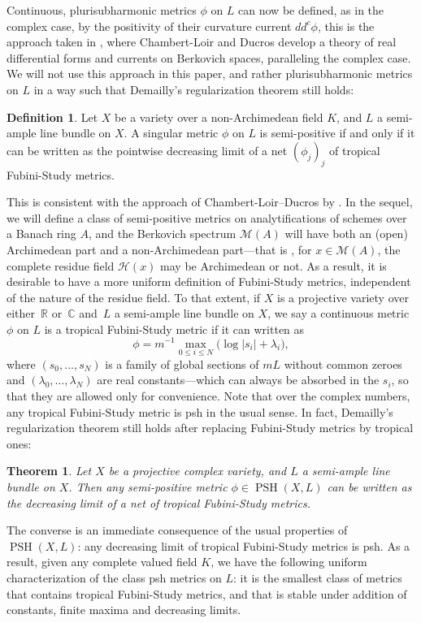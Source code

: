 \documentclass[JEP,XML,SOM,Unicode,published]{cedram}
\newtheorem{theo}[equation]{Theorem}
\theoremstyle{definition}
\newtheorem{defn}[equation]{Definition}
\newcommand \C{\mathbb C}
\newcommand \R{\mathbb R}
\newcommand \M {\mathscr {M}}
\DeclareMathOperator{\PSH}{PSH}
\begin{document}
Continuous, plurisubharmonic metrics $\phi$ on $L$ can now be defined, as in the complex case, by the positivity of their curvature current $dd^c \phi$, this is the approach taken in \cite{CLD}, where Chambert-Loir and Ducros develop a theory of real differential forms and currents on Berkovich spaces, paralleling the complex case. We will not use this approach in this paper, and rather plurisubharmonic metrics on $L$ in a way such that Demailly's regularization theorem still holds:
\begin{defn} Let $X$ be a variety over a non-Archimedean field $K$, and $L$ a semi-ample line bundle on $X$. A singular metric $\phi$ on $L$ is semi-positive if and only if it can be written as the pointwise decreasing limit of a net $(\phi_j)_{j}$ of tropical Fubini-Study metrics.
\end{defn}
This is consistent with the approach of Chambert-Loir--Ducros by \cite[Th.\,7.14]{BE}.
In the sequel, we will define a class of semi-positive metrics on analytifications of schemes over a Banach ring $A$, and the Berkovich spectrum $\M(A)$ will have both an (open) Archimedean part and a non-Archimedean part---that is , for $x \in \M(A)$, the complete residue field $\mathscr{H}(x)$ may be Archimedean or not. As a result, it is desirable to have a more uniform definition of Fubini-Study metrics, independent of the nature of the residue field. To that extent, if $X$ is a projective variety over either~$\R$ or~$\C$ and~$L$ a semi-ample line bundle on $X$, we say a continuous metric $\phi$ on $L$ is a tropical Fubini-Study metric if it can written as
\[
\phi =m^{-1} \max_{0 \le i \le N} \bigl(\log \lvert s_i \rvert + \lambda_i \bigr),
\]
where $(s_0,\dots,s_N)$ is a family of global sections of $mL$ without common zeroes and $(\lambda_0,\dots,\lambda_N)$ are real constants---which can always be absorbed in the $s_i$, so that they are allowed only for convenience. Note that over the complex numbers, any tropical Fubini-Study metric is psh in the usual sense. In fact, Demailly's regularization theorem still holds after replacing Fubini-Study metrics by tropical ones:
\begin{theo} \label{theo psh1} Let $X$ be a projective complex variety, and $L$ a semi-ample line bundle on $X$. Then any semi-positive metric $\phi \in \PSH(X, L)$ can be written as the decreasing limit of a net of tropical Fubini-Study metrics.
\end{theo}
The converse is an immediate consequence of the usual properties of $\PSH(X, L)$: any decreasing limit of tropical Fubini-Study metrics is psh. As a result, given any complete valued field $K$, we have the following uniform characterization of the class psh metrics on $L$: it is the smallest class of metrics that contains tropical Fubini-Study metrics, and that is stable under addition of constants, finite maxima and decreasing limits.
\end{document}
